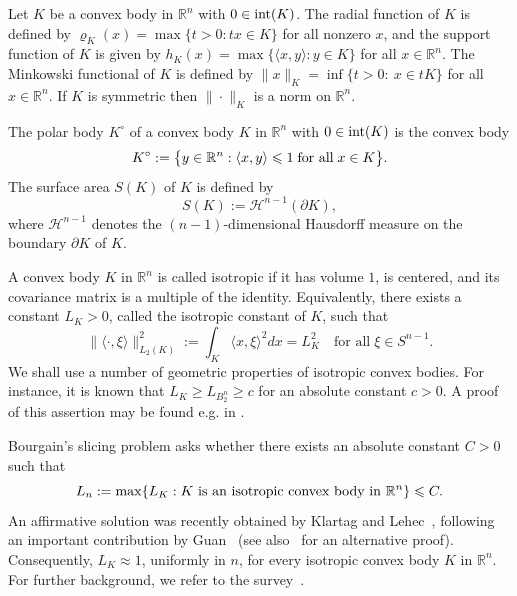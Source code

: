 \documentclass[11pt,leqno]{article}
\theoremstyle{definition}
\theoremstyle{remark}
\numberwithin{equation}{section}
\newcommand{\ls}{\leqslant}
\newcommand{\gr}{\geqslant}
\newcommand{\1}{\textbf{1}}
\begin{document}
Let $K$ be a convex body in $\mathbb{R}^n$ with $0\in {\rm int}(K)$. 
The radial function of $K$ is defined by $\varrho_K(x) = \max\{ t > 0 : t x \in K \}$ for all nonzero $x$, and the support function of $K$ is given by 
$h_K(x)=\max\{\langle x,y\rangle :y\in K \}$ for all $x\in\mathbb{R}^n$. The Minkowski functional
of $K$ is defined by $\|x\|_K = \inf\{t>0:\ x\in tK\}$ for all $x\in\mathbb{R}^n$. If $K$ is symmetric then $\|\cdot\|_K$ is a norm on $\mathbb{R}^n$.

The polar body $K^{\circ }$ of a convex body $K$ in ${\mathbb R}^n$ with $0\in {\rm int}(K)$ is the convex body
\begin{equation*}
K^{\circ}:=\bigl\{y\in {\mathbb R}^n: \langle x,y\rangle \ls 1\;\hbox{for all}\; x\in K\bigr\}.
\end{equation*}
The surface area $S(K)$ of $K$ is defined by
$$S(K):=\mathcal{H}^{n-1}(\partial K),$$
where $\mathcal{H}^{n-1}$ denotes the $(n-1)$-dimensional Hausdorff measure on the boundary $\partial K$ of $K$. 

A convex body $K$ in ${\mathbb R}^n$ is called isotropic if it has volume $1$, is centered, and its covariance matrix is a multiple of the identity. 
Equivalently, there exists a constant $L_K>0$, called the isotropic constant of $K$, such that
\begin{equation*}
\|\langle \cdot ,\xi\rangle\|_{L_2(K)}^2:=\int_K\langle x,\xi\rangle^2dx =L_K^2\quad\text{for all}\;\xi\in S^{n-1}.
\end{equation*}
We shall use a number of geometric properties of isotropic convex bodies. For instance, it is known that $L_K\gr L_{B_2^n}\gr c$ for an absolute constant $c>0$. A proof of this assertion may be found e.g. in \cite[Chapter~3]{BGVV-book}.

Bourgain's slicing problem \cite{Bourgain-1986} asks whether there exists an absolute constant $C>0$ such that
\begin{equation}\label{eq:conjecture}
L_n:=\max\{ L_K:K\ \hbox{is an isotropic convex body in}\ \mathbb{R}^n\}\ls C.
\end{equation}
An affirmative solution was recently obtained by Klartag and Lehec~\cite{Klartag-Lehec-2025}, following an important
contribution by Guan~\cite{Guan-preprint} (see also~\cite{Bizeul-2025} for an alternative proof). 
Consequently, $L_K\approx 1$, uniformly in $n$, for every isotropic convex body $K$ in $\mathbb{R}^n$.
For further background, we refer to the survey~\cite{Giannopoulos-Pafis-Tziotziou-2025}.
\end{document}
